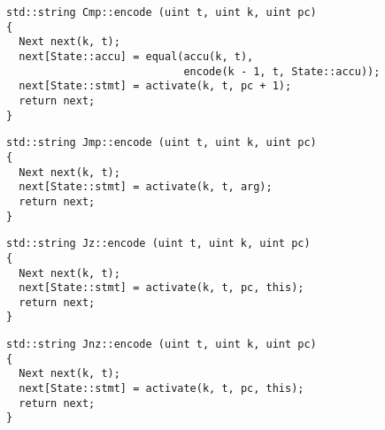 \begin{lstlisting}[style=c++, style=encode]
std::string Cmp::encode (uint t, uint k, uint pc)
{
  Next next(k, t);
  next[State::accu] = equal(accu(k, t),
                            encode(k - 1, t, State::accu));
  next[State::stmt] = activate(k, t, pc + 1);
  return next;
}
\end{lstlisting}


\begin{lstlisting}[style=c++, style=encode]
std::string Jmp::encode (uint t, uint k, uint pc)
{
  Next next(k, t);
  next[State::stmt] = activate(k, t, arg);
  return next;
}
\end{lstlisting}


\begin{lstlisting}[style=c++, style=encode]
std::string Jz::encode (uint t, uint k, uint pc)
{
  Next next(k, t);
  next[State::stmt] = activate(k, t, pc, this);
  return next;
}
\end{lstlisting}


\newpage

\begin{lstlisting}[style=c++, style=encode]
std::string Jnz::encode (uint t, uint k, uint pc)
{
  Next next(k, t);
  next[State::stmt] = activate(k, t, pc, this);
  return next;
}
\end{lstlisting}


